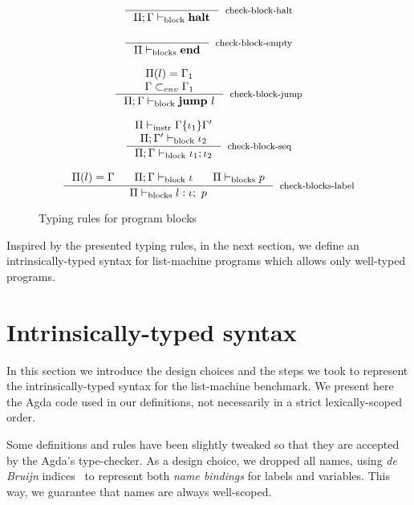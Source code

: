 \documentclass[review]{elsarticle}
\theoremstyle{definition}
\begin{document}
\begin{figure}[H]
\[
\begin{array}{c}
   \inference{}
             {\Pi;\Gamma\vdash_{\text{block}} \textbf{halt}}[check-block-halt]
   \\ \\
   \inference{}
             {\Pi\vdash_{\text{blocks}} \textbf{end}}[check-block-empty]\\ \\

   \inference{\Pi(l)=\Gamma_1\\ \Gamma \subset_{env} \Gamma_1}
             {\Pi;\Gamma\vdash_{\text{block}} \textbf{jump}~l}[check-block-jump]

   \\ \\

   \inference{\Pi\vdash_{\text{instr}} \Gamma\{\iota_1\}\Gamma'\\ \Pi;\Gamma'\vdash_{\text{block}} \iota_2}
             {\Pi;\Gamma\vdash_{\text{block}} \iota_1;\iota_2}[check-block-seq]
 \\ \\

   \inference{\Pi(l)=\Gamma\:\:\:\:\:\:\:\:\Pi;\Gamma\vdash_{\text{block}} \iota\:\:\:\:\:\:\:\:\Pi\vdash_{\text{blocks}} p}
     {\Pi\vdash_{\text{blocks}} l: \iota;~p}[check-blocks-label]
\end{array}
\]
\centering
\caption{Typing rules for program blocks}
\label{fig:typing-block}
\end{figure}
Inspired by the presented typing rules, in the next section, we define an
intrinsically-typed syntax for list-machine programs which allows
only well-typed pro\-grams.

\section{Intrinsically-typed syntax}\label{sec:typing}


In this section we introduce the design choices and the steps we took to represent the
intrinsically-typed syntax for the list-machine benchmark. We present here the Agda
code used in our definitions, not necessarily in a strict lexically-scoped order.

Some definitions and rules have been slightly tweaked so that they are accepted by
the Agda's type-checker. As a design choice, we dropped all names, using
\emph{de Bruijn} indices~\cite{DEBRUIJN72} to represent both \emph{name bindings}
for labels and variables. This way, we guarantee that names are always well-scoped.
\end{document}

